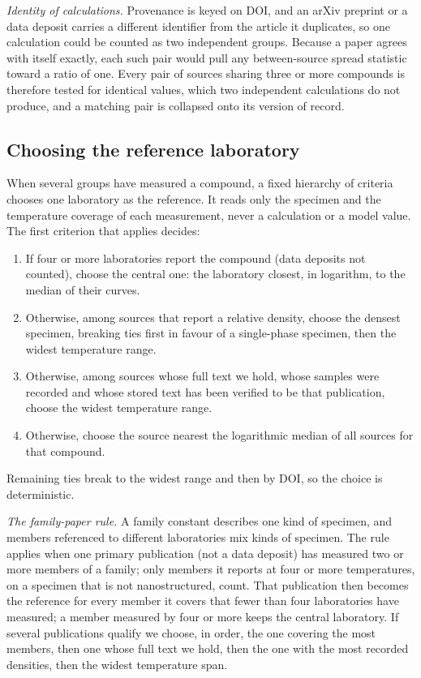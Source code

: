 \documentclass[preprint, 12pt]{elsarticle}
\begin{document}
\emph{Identity of calculations.} Provenance is keyed on DOI, and an arXiv preprint or a data deposit
carries a different identifier from the article it duplicates, so one calculation could be counted
as two independent groups. Because a paper agrees with itself exactly, each such pair would pull any
between-source spread statistic toward a ratio of one. Every pair of sources sharing three or more
compounds is therefore tested for identical values, which two independent calculations do not
produce, and a matching pair is collapsed onto its version of record.

\subsection*{Choosing the reference laboratory}

When several groups have measured a compound, a fixed hierarchy of criteria chooses one laboratory as the
reference. It reads only the specimen and the temperature coverage of each measurement, never a
calculation or a model value. The first criterion that applies decides:
\begin{enumerate}
  \item If four or more laboratories report the compound (data deposits not counted), choose the
        central one: the laboratory closest, in logarithm, to the median of their curves.
  \item Otherwise, among sources that report a relative density, choose the densest specimen,
        breaking ties first in favour of a single-phase specimen, then the widest temperature range.
  \item Otherwise, among sources whose full text we hold, whose samples were recorded and whose
        stored text has been verified to be that publication, choose the widest temperature range.
  \item Otherwise, choose the source nearest the logarithmic median of all sources for that
        compound.
\end{enumerate}
Remaining ties break to the widest range and then by DOI, so the choice is deterministic.

\emph{The family-paper rule.} A family constant describes one kind of specimen, and members referenced
to different laboratories mix kinds of specimen. The rule applies when one primary publication (not a
data deposit) has measured two or more members of a family; only members it reports at four or more
temperatures, on a specimen that is not nanostructured, count. That publication then becomes the
reference for every member it covers that fewer than four laboratories have measured; a member
measured by four or more keeps the central laboratory. If several publications qualify we choose, in
order, the one covering the most members, then one whose full text we hold, then the one with the
most recorded densities, then the widest temperature span.
\end{document}
